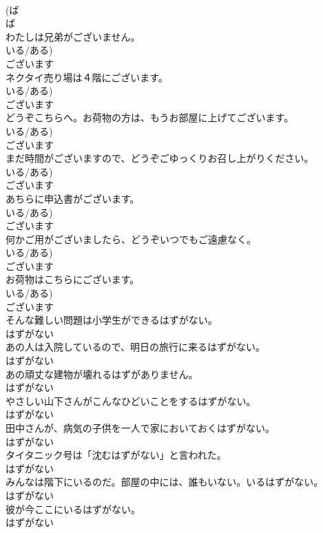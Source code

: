 \documentclass[8pt]{extreport}
\begin{document}
\begin{CJK}{UTF8}{min}
\\	(ば 
\\	ば
\\	わたしは兄弟がございません。	
\\	いる/ある)	
\\	ございます
\\	ネクタイ売り場は４階にございます。	
\\	いる/ある)	
\\	ございます
\\	どうぞこちらへ。お荷物の方は、もうお部屋に上げてございます。	
\\	いる/ある)	
\\	ございます
\\	まだ時間がございますので、どうぞごゆっくりお召し上がりください。	
\\	いる/ある)	
\\	ございます
\\	あちらに申込書がございます。	
\\	いる/ある)	
\\	ございます
\\	何かご用がございましたら、どうぞいつでもご遠慮なく。	
\\	いる/ある)	
\\	ございます
\\	お荷物はこちらにございます。	
\\	いる/ある)	
\\	ございます
\\	そんな難しい問題は小学生ができるはずがない。	
\\	はずがない
\\	あの人は入院しているので、明日の旅行に来るはずがない。	
\\	はずがない
\\	あの頑丈な建物が壊れるはずがありません。	
\\	はずがない
\\	やさしい山下さんがこんなひどいことをするはずがない。	
\\	はずがない
\\	田中さんが、病気の子供を一人で家においておくはずがない。	
\\	はずがない
\\	タイタニック号は「沈むはずがない」と言われた。	
\\	はずがない
\\	みんなは階下にいるのだ。部屋の中には、誰もいない。いるはずがない。	
\\	はずがない
\\	彼が今ここにいるはずがない。	
\\	はずがない

\end{CJK}
\end{document}
